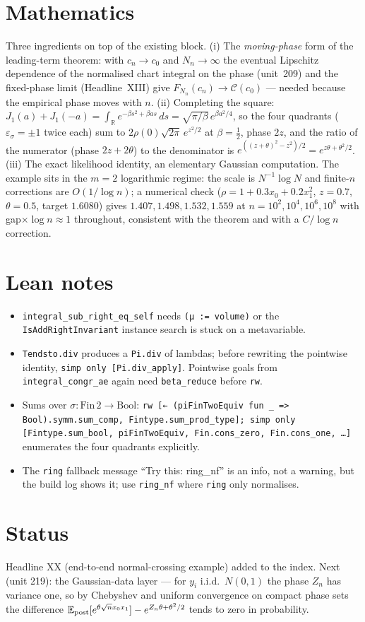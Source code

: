 \documentclass[11pt]{article}
\begin{document}
\section{Mathematics}
Three ingredients on top of the existing block. (i) The \emph{moving-phase} form of the leading-term
theorem: with $c_n\to c_0$ and $N_n\to\infty$ the eventual Lipschitz dependence of the normalised
chart integral on the phase (unit~209) and the fixed-phase limit (Headline~XIII) give
$F_{N_n}(c_n)\to\mathcal C(c_0)$ --- needed because the empirical phase moves with $n$.
(ii) Completing the square: $J_1(a)+J_1(-a)=\int_{\mathbb R}e^{-\beta s^2+\beta as}\,ds
=\sqrt{\pi/\beta}\,e^{\beta a^2/4}$, so the four quadrants ($\varepsilon_\sigma=\pm1$ twice each)
sum to $2\rho(0)\sqrt{2\pi}\,e^{z^2/2}$ at $\beta=\tfrac12$, phase $2z$, and the ratio of the
numerator (phase $2z+2\theta$) to the denominator is $e^{((z+\theta)^2-z^2)/2}=e^{z\theta+\theta^2/2}$.
(iii) The exact likelihood identity, an elementary Gaussian computation. The example sits in the
$m=2$ logarithmic regime: the scale is $N^{-1}\log N$ and finite-$n$ corrections are $O(1/\log n)$;
a numerical check ($\rho=1+0.3x_0+0.2x_1^2$, $z=0.7$, $\theta=0.5$, target $1.6080$) gives
$1.407,1.498,1.532,1.559$ at $n=10^2,10^4,10^6,10^8$ with gap$\times\log n\approx1$ throughout,
consistent with the theorem and with a $C/\log n$ correction.

\section{Lean notes}
\begin{itemize}
\item \texttt{integral\_sub\_right\_eq\_self} needs \texttt{(μ := volume)} or the
  \texttt{IsAddRightInvariant} instance search is stuck on a metavariable.
\item \texttt{Tendsto.div} produces a \texttt{Pi.div} of lambdas; before rewriting the pointwise
  identity, \texttt{simp only [Pi.div\_apply]}. Pointwise goals from \texttt{integral\_congr\_ae}
  again need \texttt{beta\_reduce} before \texttt{rw}.
\item Sums over $\sigma:\mathrm{Fin}\,2\to\mathrm{Bool}$: \texttt{rw [← (piFinTwoEquiv fun \_ => Bool).symm.sum\_comp,
  Fintype.sum\_prod\_type]; simp only [Fintype.sum\_bool, piFinTwoEquiv, Fin.cons\_zero, Fin.cons\_one, …]}
  enumerates the four quadrants explicitly.
\item The \texttt{ring} fallback message ``Try this: ring\_nf'' is an info, not a warning, but the
  build log shows it; use \texttt{ring\_nf} where \texttt{ring} only normalises.
\end{itemize}

\section{Status}
Headline XX (end-to-end normal-crossing example) added to the index. Next (unit 219): the Gaussian-data
layer --- for $y_i$ i.i.d.\ $N(0,1)$ the phase $Z_n$ has variance one, so by Chebyshev and uniform
convergence on compact phase sets the difference $\mathbb E_{\rm post}[e^{\theta\sqrt n x_0x_1}]-
e^{Z_n\theta+\theta^2/2}$ tends to zero in probability.
\end{document}
